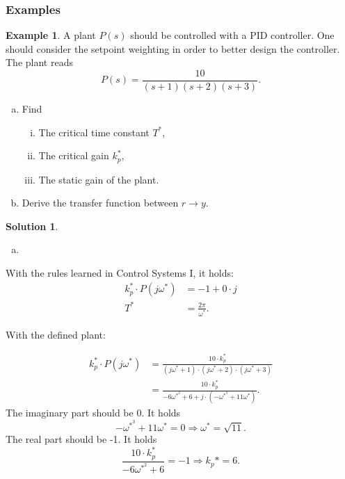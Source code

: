 \documentclass[a4paper,12 pt]{article}
\numberwithin{equation}{section}
\theoremstyle{definition}
\newtheorem{bsp}{Example}
\theoremstyle{remark}
\theoremstyle{definition}
\newtheorem*{lsg}{Solution}
\theoremstyle{definition}
\theoremstyle{definition}
\theoremstyle{remark}
\begin{document}
\subsubsection{Examples}
\begin{bsp}
A plant $P(s)$ should be controlled with a PID controller. One should consider the setpoint weighting in order to better design the controller. The plant reads
\begin{equation*}
P(s)=\frac{10}{(s+1)(s+2)(s+3)}.
\end{equation*}
\begin{enumerate}[(a)]
\item Find 
\begin{enumerate}[i)]
\item The critical time constant $T^*$,
\item The critical gain $k_p^*$,
\item The static gain of the plant.
\end{enumerate}
\item Derive the transfer function between $r\rightarrow y$. 
\end{enumerate}
\newpage
\begin{lsg} 
\
\begin{enumerate}[(a)]
\item
\end{enumerate}

With the rules learned in Control Systems I, it holds:
\begin{equation*}
\begin{split}
k_p^*\cdot P(j\omega^*) &= -1 + 0\cdot j\\
T^*&=\frac{2\pi}{\omega^*}.
\end{split}
\end{equation*}

With the defined plant:

\begin{equation*}
\begin{split}
k_p^*\cdot P(j\omega^*)&=\frac{10\cdot k_p^*}{(j\omega^*+1)\cdot(j\omega^*+2)\cdot(j\omega^*+3)}\\
&=\frac{10\cdot k_p^*}{-6\omega^{*^2}+6+j\cdot (-\omega^{*^3}+11\omega^*)}.
\end{split}
\end{equation*}
The imaginary part should be 0. It holds
\begin{equation*}
-\omega^{*^3}+11\omega^*=0 \Rightarrow \omega^*=\sqrt{11}.
\end{equation*}
The real part should be -1. It holds
\begin{equation*}
\frac{10\cdot k_p^*}{-6\omega^{*^2}+6}=-1 \Rightarrow k_p*=6.
\end{equation*}


\end{lsg}
\end{bsp}
\end{document}
